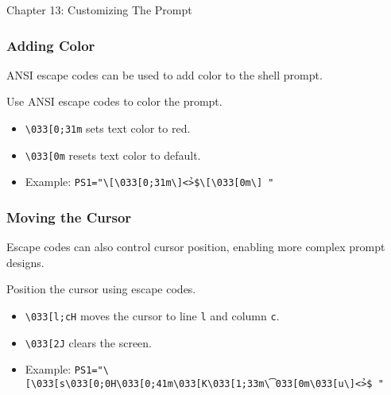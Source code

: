 \begin{notes}{Chapter 13: Customizing The Prompt}
\begin{highlight}
    \end{highlight}
    
    \subsubsection*{Adding Color}
    
    ANSI escape codes can be used to add color to the shell prompt.
    
    \begin{highlight}
    
    Use ANSI escape codes to color the prompt.
    
    \begin{itemize}
        \item \texttt{\textbackslash{}033[0;31m} sets text color to red.
        \item \texttt{\textbackslash{}033[0m} resets text color to default.
        \item Example: \texttt{PS1="\textbackslash{}[\textbackslash{}033[0;31m\textbackslash{}]<\u@\h \W>\$\textbackslash{}[\textbackslash{}033[0m\textbackslash{}] "}
    \end{itemize}
    
    \end{highlight}
    
    \subsubsection*{Moving the Cursor}
    
    Escape codes can also control cursor position, enabling more complex prompt designs.
    
    \begin{highlight}
    
    Position the cursor using escape codes.
    
    \begin{itemize}
        \item \texttt{\textbackslash{}033[l;cH} moves the cursor to line \texttt{l} and column \texttt{c}.
        \item \texttt{\textbackslash{}033[2J} clears the screen.
        \item Example: \texttt{PS1="\textbackslash{}[\textbackslash{}033[s\textbackslash{}033[0;0H\textbackslash{}033[0;41m\textbackslash{}033[K\textbackslash{}033[1;33m\t\textbackslash{}033[0m\textbackslash{}033[u\textbackslash{}]<\u@\h \W>\$ "}
    \end{itemize}
    

\end{highlight}
\end{notes}
